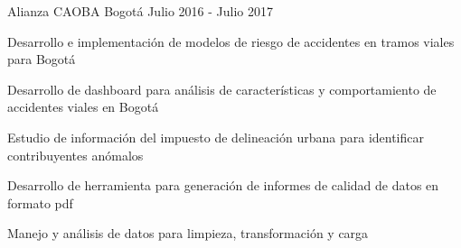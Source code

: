 \begin{cventries}
  {Alianza CAOBA} %
  {Bogotá} %
  {Julio 2016 - Julio 2017} %
  {
    \begin{cvitems}
    \item{Desarrollo e implementación de modelos de riesgo de accidentes en tramos viales para Bogotá}
    \item{Desarrollo de dashboard para análisis de características y comportamiento de accidentes viales en Bogotá}
    \item{Estudio de información del impuesto de delineación urbana para identificar contribuyentes anómalos}
    \item{Desarrollo de herramienta para generación de informes de calidad de datos en formato pdf}
    \item{Manejo y análisis de datos para limpieza, transformación y carga}
    \end{cvitems}
  } %


  \vspace{-0.5cm}
\end{cventries}
